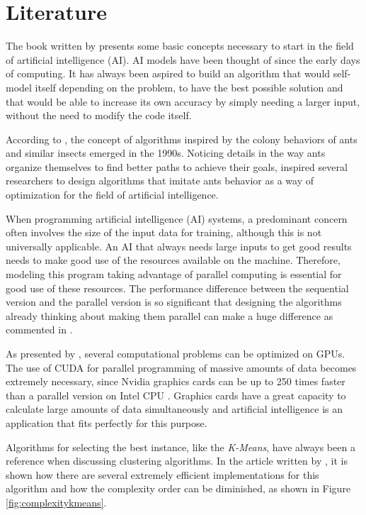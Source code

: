 \section{Literature}

The book written by \cite{BookIA} presents some basic concepts necessary to start in the field of artificial intelligence (AI).
AI models have been thought of since the early days of computing. It has always been aspired to build an algorithm
that would self-model itself depending on the problem, to have the best possible solution
and that would be able to increase its own accuracy by simply needing a larger input, without the need to modify
the code itself.

According to \cite{AntColonyOptimization}, the concept of algorithms
inspired by the colony behaviors of ants and similar insects emerged in the 1990s.
Noticing details in the way ants organize themselves to find better
paths to achieve their goals, inspired several researchers to design algorithms that imitate ants behavior as a way
of optimization for the field of artificial intelligence.

When programming artificial intelligence (AI) systems, a predominant concern often involves the size of the input data for training, although this is not universally applicable.
An AI that always needs large inputs to get good results needs to make good use of the resources available on the machine.
Therefore, modeling this program taking advantage of parallel computing is essential for good use of these resources.
The performance difference between the sequential version and the parallel version is so significant that designing the algorithms
already thinking about making them parallel can make a huge difference as commented in \cite{SequentialVSParallel}.

As presented by \cite{ParallelComputingCUDA}, several computational problems can be optimized on GPUs.
The use of CUDA for parallel programming of massive amounts of data becomes extremely necessary, since
Nvidia graphics cards can be up to 250 times faster than a parallel version on Intel CPU \cite{ParallelComputingCUDA}.
Graphics cards have a great capacity to calculate large amounts of data simultaneously and artificial intelligence
is an application that fits perfectly for this purpose.

Algorithms for selecting the best instance, like the \emph{K-Means}, have always been a reference when discussing clustering algorithms. In the article written by \cite{KmeansAlgorithm},
it is shown how there are several extremely efficient implementations for this algorithm and how the complexity order can be diminished, as shown in Figure \ref{fig:complexitykmeans}.

